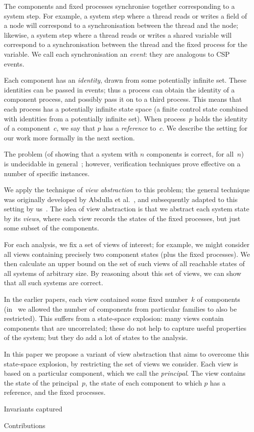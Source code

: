 The components and fixed processes synchronise together corresponding to a
system step.  For example, a system step where a thread reads or writes a
field of a node will correspond to a synchronisation between the thread and
the node; likewise, a system step where a thread reads or writes a shared
variable will correspond to a synchronisation between the thread and the fixed
process for the variable.  We call each synchronisation an \emph{event}: they
are analogous to CSP events.

Each component has an \emph{identity}, drawn from some potentially infinite
set.  These identities can be passed in events; thus a process can obtain the
identity of a component process, and possibly pass it on to a third process.
This means that each process has a potentially infinite state space (a finite
control state combined with identities from a potentially infinite set).  When
process~$p$ holds the identity of a component~$c$, we say that $p$ has a
\emph{reference} to~$c$.  We describe the setting for our work more formally
in the next section.

The problem (of showing that a system with $n$ components is correct, for
all~$n$) is undecidable in general~\cite{apt-kozen,tomasz-gavin-CA}; however,
verification techniques prove effective on a number of specific instances.

We apply the technique of \emph{view abstraction} to this problem; the general
technique was originally developed by Abdulla et al.~\cite{AHH}, and
subsequently adapted to this setting by us~\cite{gavin:view-abs}.
The idea of view abstraction is that we abstract each system
state by its \emph{views}, where each view records the states of the fixed
processes, but just some subset of the components.  

For each analysis, we fix a set of views of interest; for example, we might
consider all views containing precisely two component states (plus the fixed
processes).  We then calculate an upper bound on the set of such views of all
reachable states of all systems of arbitrary size.  By reasoning about this
set of views, we can show that all such systems are correct.

In the earlier papers, each view contained some fixed number~$k$ of components
(in~\cite{gavin:view-abs} we allowed the number of components from particular
families to also be restricted).  This suffers from a state-space explosion:
many views contain components that are uncorrelated; these do not help to
capture useful properties of the system; but they do add a lot of states to
the analysis.  

In this paper we propose a variant of view abstraction that aims to overcome
this state-space explosion, by restricting the set of views we consider.  Each
view is based on a particular component, which we call the \emph{principal}.
The view contains the state of the principal~$p$, the state of each component
to which $p$ has a reference, and the fixed processes. 


Invariants captured

Contributions


